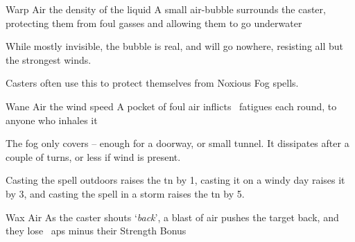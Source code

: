 \ifodd\value{diceNo}

  {}%
  {Warp}%
  {Air}%
  {the density of the liquid}%
  {A small air-bubble surrounds the caster, protecting them from foul gasses and allowing them to go underwater}%
  {While mostly invisible, the bubble is real, and will go nowhere, resisting all but the strongest winds.

    Casters often use this to protect themselves from Noxious Fog spells.}

  {}%
  {Wane}%
  {Air}%
  {the wind speed}%
  {A pocket of foul air inflicts ~\glspl{fatigue} each round, to anyone who inhales it}%
  {

    The fog only covers  -- enough for a doorway, or small tunnel.
    It dissipates after a couple of turns, or less if wind is present.

    Casting the spell outdoors raises the \gls{tn} by 1, casting it on a windy day raises it by 3, and casting the spell in a storm raises the \gls{tn} by 5.
  }

\else

  {}%
  {Wax}%
  {Air}%
  {}%
  {As the caster shouts `\textit{back}', a blast of air pushes the target back, and they lose ~\glspl{ap} minus their Strength Bonus}%
  {}

\fi
{}
